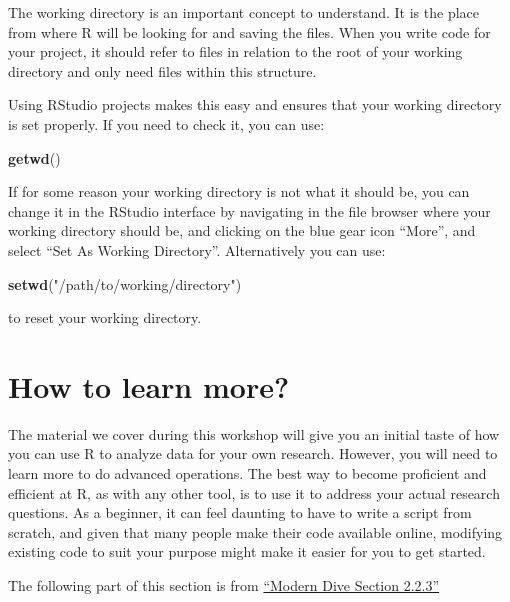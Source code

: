 \documentclass[]{book}
\newenvironment{Shaded}{\begin{snugshade}}{\end{snugshade}}
\newcommand{\KeywordTok}[1]{\textcolor[rgb]{0.13,0.29,0.53}{\textbf{#1}}}
\newcommand{\NormalTok}[1]{#1}
\newcommand{\StringTok}[1]{\textcolor[rgb]{0.31,0.60,0.02}{#1}}
\begin{document}
The working directory is an important concept to understand. It is the place from where R will be looking for and saving the files. When you write code for your project, it should refer to files in relation to the root of your working directory and only need files within this structure.

Using RStudio projects makes this easy and ensures that your working directory is set properly. If you need to check it, you can use:

\begin{Shaded}
\begin{Highlighting}[]
\KeywordTok{getwd}\NormalTok{()}
\end{Highlighting}
\end{Shaded}

If for some reason your working directory is not what it should be, you can change it in the RStudio interface by navigating in the file browser where your working directory should be, and clicking on the blue gear icon ``More'', and select ``Set As Working Directory''. Alternatively you can use:

\begin{Shaded}
\begin{Highlighting}[]
\KeywordTok{setwd}\NormalTok{(}\StringTok{"/path/to/working/directory"}\NormalTok{)}
\end{Highlighting}
\end{Shaded}

to reset your working directory.

\hypertarget{how-to-learn-more}{%
\section{How to learn more?}\label{how-to-learn-more}}

The material we cover during this workshop will give you an initial taste of how you can use R to analyze data for your own research. However, you will need to learn more to do advanced operations. The best way to become proficient and efficient at R, as with any other tool, is to use it to address your actual research questions. As a beginner, it can feel daunting to have to write a script from scratch, and given that many people make their code available online, modifying existing code to suit your purpose might make it easier for you to get started.

The following part of this section is from \href{\%22https://moderndive.com/2-getting-started.html\%22}{``Modern Dive Section 2.2.3''}
\end{document}
